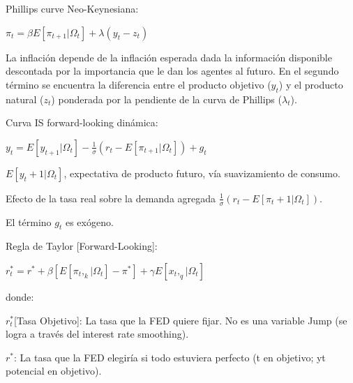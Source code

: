 \documentclass[12pt]{article}
\begin{document}
\vspace{1em}

Phillips curve Neo-Keynesiana:

\vspace{1em}

$\pi_t=\beta E[\pi_{t+1}|\Omega_t]+\lambda(y_t-z_t)$

\vspace{1em}

\indent La inflación depende de la inflación esperada dada la información disponible descontada por la importancia que le dan los agentes al futuro. En el segundo término se encuentra la diferencia entre el producto objetivo ($y_t$) y el producto natural ($z_t$) ponderada por la pendiente de la curva de Phillips ($\lambda_t$).

\vspace{1em}

Curva IS forward-looking dinámica:  

\vspace{1em}

$y_t=E[y_{t+1}|\Omega_t]-\frac{1}{\sigma}(r_t-E[\pi_{t+1}|\Omega_t])+g_t$

\vspace{1em}

$E[y_t+1|\Omega_t]$, expectativa de producto futuro, vía suavizamiento de consumo. 

Efecto de la tasa real sobre la demanda agregada $\frac{1}{\sigma}(r_t-E[\pi_t+1|\Omega_t])$.

El término $g_t$ es exógeno.

\vspace{1em}

Regla de Taylor [Forward-Looking]: 

\vspace{1em}

$r^*_t=r^*+\beta[E[\pi_t,_k|\Omega_t]-\pi^*]+\gamma E[x_t,_q|\Omega_t]$

\vspace{1em}

donde:

\vspace{1em}

$r_t^*$[Tasa Objetivo]: La tasa que la FED quiere fijar. No es una variable Jump (se logra a través del interest rate smoothing).

\vspace{1em}

$r^*$: La tasa que la FED elegiría si todo estuviera perfecto (t en objetivo; yt potencial en objetivo).
\end{document}
